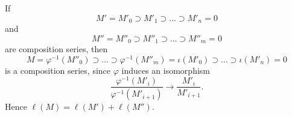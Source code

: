 If
\[ M' = M'_0 \supset M'_1 \supset \dots \supset M'_n = 0 \]
and
\[ M'' = M''_0 \supset M''_1 \supset \dots \supset M''_m = 0 \]
are composition series, then
\[ M = \varphi^{-1}(M''_0) \supset \dots \supset \varphi^{-1}(M''_m) = \iota(M'_0) \supset \dots \supset \iota(M'_n) = 0 \]
is a composition series, since $\varphi$ induces an isomorphism
\[ \frac{\varphi^{-1}(M'_i)}{\varphi^{-1}(M'_{i+1})}\to \frac{M'_i}{M'_{i+1}}. \]
Hence $\ell(M) = \ell(M') + \ell(M'')$.
